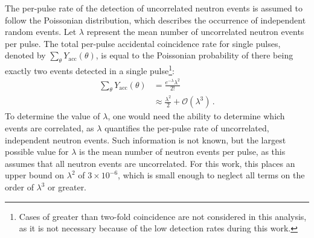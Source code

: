 \documentclass[%
 reprint,
 amsmath,amssymb,
 aps,
 nofootinbib
]{revtex4-1}
\begin{document}
The per-pulse rate of the detection of uncorrelated neutron events is assumed to follow the Poissonian distribution, which describes the occurrence of independent random events.
Let $\lambda$ represent the mean number of uncorrelated neutron events per pulse.
The total per-pulse accidental coincidence rate for single pulses, denoted by $\sum_{\theta} Y_{\text{acc}}(\theta)$, is equal to the Poissonian probability of there being exactly two events detected in a single pulse\footnote{Cases of greater than two-fold coincidence are not considered in this analysis, as it is not necessary because of the low detection rates during this work.}:%
\begin{equation} \label{math:SP}
    \begin{split}
    \sum_{\theta}Y_{\text{acc}}(\theta) & = \frac{e^{-\lambda}\lambda^{2}}{2!} \\
        &\approx \frac{\lambda^2}{{2}} + \mathcal{O}(\lambda^3) \, .
    \end{split}
\end{equation}
To determine the value of $\lambda$, one would need the ability to determine which events are correlated, as $\lambda$ quantifies the per-pulse rate of uncorrelated, independent neutron events.
Such information is not known, but the largest possible value for $\lambda$ is the mean number of neutron events per pulse, as this assumes that all neutron events are uncorrelated.
For this work, this places an upper bound on $\lambda^2$ of $3\times 10^{-6}$, which is small enough to neglect all terms on the order of $\lambda^3$ or greater.
\end{document}
